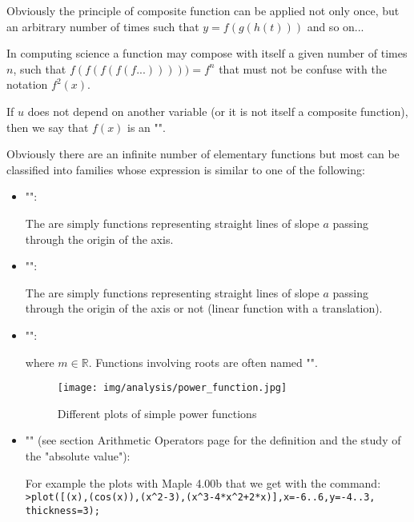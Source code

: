 \begin{enumerate}
		Obviously the principle of composite function can be applied not only once, but an arbitrary number of times such that $y=f(g(h(t)))$ and so on...
		
		In computing science a function may compose with itself a given number of times $n$, such that $f(f(f(f(f...)))))=f^n$ that must not be confuse with the notation $f^2(x)$.
		
		If $u$ does not depend on another variable (or it is not itself a composite function), then we say that $f(x)$ is an "".

		Obviously there are an infinite number of elementary functions but most can be classified into families whose expression is similar to one of the following:
		
		\begin{itemize}
			\item "":
			
			The are simply functions representing straight lines of slope $a$ passing through the origin of the axis.
			
			\item "":
			
			The are simply functions representing straight lines of slope $a$ passing through the origin of the axis or not (linear function with a translation).
						
			\item "":
			
			where $m\in\mathbb{R}$. Functions involving roots are often named "".
			\begin{figure}[H]
				\centering
				\texttt{[image: img/analysis/power\_function.jpg]}
				\caption{Different plots of simple power functions}
			\end{figure}
			
			\item "\label{absolute value plot}" (see section Arithmetic Operators page \pageref{absolute value} for the definition and the study of the "absolute value"):
			
			For example the plots with Maple 4.00b that we get with the command:\\
			
			\texttt{>plot([(x),(cos(x)),(x\string^2-3),(x\string^3-4*x\string^2+2*x)],x=-6..6,y=-4..3,\\
			thickness=3);}	
			

\end{itemize}
\end{enumerate}
